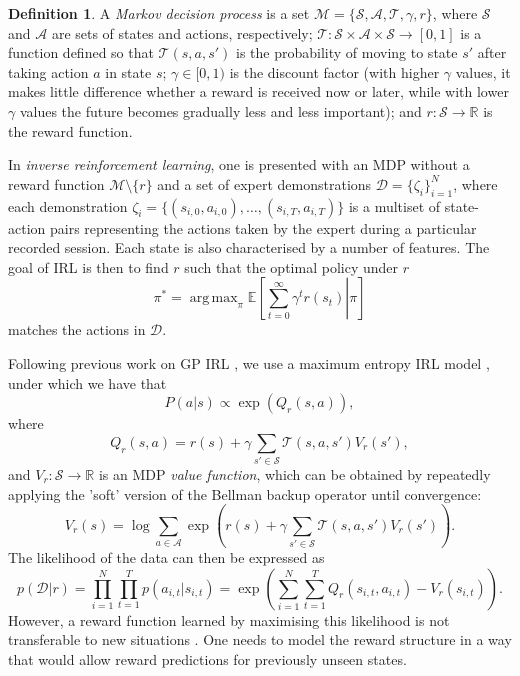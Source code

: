 \documentclass{mprop}
\theoremstyle{definition}
\newtheorem{definition}{Definition}
\DeclareMathOperator*{\argmax}{arg\,max}
\begin{document}
\begin{definition}
  A \emph{Markov decision process} is a set $\mathcal{M} = \{ \mathcal{S},
  \mathcal{A}, \mathcal{T}, \gamma, r \}$, where $\mathcal{S}$ and
  $\mathcal{A}$ are sets of states and actions, respectively; $\mathcal{T} :
  \mathcal{S} \times \mathcal{A} \times \mathcal{S} \to [0, 1]$ is a function
  defined so that $\mathcal{T}(s, a, s')$ is the probability of moving to state $s'$
  after taking action $a$ in state $s$; $\gamma \in [0, 1)$ is the discount
  factor (with higher $\gamma$ values, it makes little difference whether a
  reward is received now or later, while with lower $\gamma$ values the future
  becomes gradually less and less important); and $r : \mathcal{S} \to
  \mathbb{R}$ is the reward function.
\end{definition}

In \emph{inverse reinforcement learning}, one is presented with an MDP without a
reward function $\mathcal{M} \setminus \{ r \}$ and a set of expert
demonstrations $\mathcal{D} = \{ \zeta_i \}_{i=1}^N$, where each demonstration
$\zeta_i = \{ (s_{i,0}, a_{i,0}), \dots, (s_{i,T}, a_{i,T}) \}$ is a multiset of
state-action pairs representing the actions taken by the expert during a
particular recorded session. Each state is also characterised by a number of
features. The goal of IRL is then to find $r$ such that the optimal policy under
$r$
\[ \pi^* = \argmax_\pi \mathbb{E}\left[ \left. \sum_{t=0}^\infty \gamma^t r(s_t)
    \right| \pi \right] \]
matches the actions in $\mathcal{D}$.

Following previous work on GP IRL
\cite{DBLP:conf/nips/LevinePK11,DBLP:conf/uai/JinDAS17}, we use a maximum
entropy IRL model \cite{ziebart2008maximum}, under which we have that
\[ P(a | s) \propto \exp(Q_r(s, a)), \]
where
\begin{equation}
  Q_r(s, a) = r(s) + \gamma\sum_{s' \in \mathcal{S}}
  \mathcal{T}(s, a, s')V_r(s'),
\end{equation}
and $V_r : \mathcal{S} \to \mathbb{R}$ is an MDP \emph{value function}, which
can be obtained by repeatedly applying the 'soft' version of the Bellman backup
operator until convergence:
\cite{DBLP:conf/nips/LevinePK11,supplementary_material}
\[ V_r(s) = \log \sum_{a \in \mathcal{A}} \exp\left( r(s) + \gamma\sum_{s' \in
      \mathcal{S}} \mathcal{T}(s, a, s')V_r(s') \right). \]
The likelihood of the data can then be expressed as
\cite{DBLP:conf/uai/JinDAS17,DBLP:conf/nips/LevinePK11}
\begin{equation} \label{pDr}
  p(\mathcal{D} | r) = \prod_{i=1}^N \prod_{t=1}^T p(a_{i,t} | s_{i,t}) = \exp\left( \sum_{i=1}^N \sum_{t=1}^T Q_r(s_{i,t}, a_{i,t}) - V_r(s_{i,t}) \right).
\end{equation}
However, a reward function learned by maximising this likelihood is not
transferable to new situations
\cite{DBLP:conf/uai/JinDAS17,DBLP:conf/nips/LevinePK11}. One needs to model the
reward structure in a way that would allow reward predictions for previously
unseen states.
\end{document}
